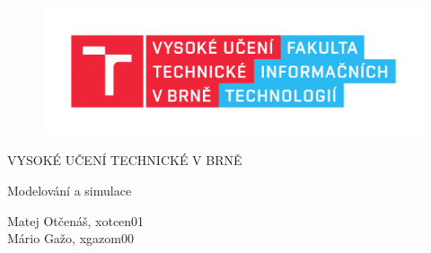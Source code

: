 \documentclass{article}
\begin{document}
\begin{titlepage}
\begin{figure}[t]
\includegraphics[width=1\textwidth,center]{fit_pic.png}
\end{figure}

\centering

{\LARGE\series VYSOKÉ UČENÍ TECHNICKÉ V BRNĚ}

\vspace{1cm}

{\LARGE Modelování a simulace}

\vspace{4cm}

\vspace{0.7cm}


\vspace{1.5cm}

{\large Matej Otčenáš, xotcen01}\\
{\large Mário Gažo, xgazom00}

\vspace{1cm}


\vfill

\end{titlepage}

\renewcommand{\figurename}{Obrázok}
\renewcommand{\contentsname}{Obsah}
\renewcommand\bibname{Zdroje}


\tableofcontents
\newpage
\end{document}
